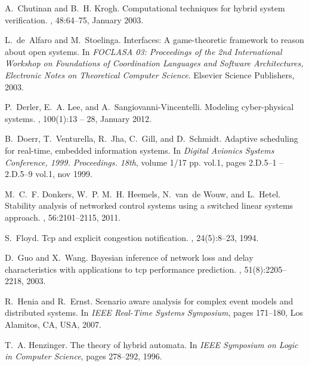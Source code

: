 \documentclass{sig-alternate-ipsn13}
\begin{document}
\begin{thebibliography}{10}
A.~Chutinan and B.~H. Krogh.
\newblock Computational techniques for hybrid system verification.
, 48:64--75, January
  2003.

L.~de~Alfaro and M.~Stoelinga.
\newblock Interfaces: A game-theoretic framework to reason about open systems.
\newblock In {\em FOCLASA 03: Proceedings of the 2nd International Workshop on
  Foundations of Coordination Languages and Software Architectures, Electronic
  Notes on Theoretical Computer Science}. Elsevier Science Publishers, 2003.

P.~Derler, E.~A. Lee, and A.~Sangiovanni-Vincentelli.
\newblock Modeling cyber-physical systems.
, 100(1):13 --
  28, January 2012.

B.~Doerr, T.~Venturella, R.~Jha, C.~Gill, and D.~Schmidt.
\newblock Adaptive scheduling for real-time, embedded information systems.
\newblock In {\em Digital Avionics Systems Conference, 1999. Proceedings.
  18th}, volume 1/17 pp. vol.1, pages 2.D.5--1 --2.D.5--9 vol.1, nov 1999.

M.~C.~F. Donkers, W.~P. M.~H. Heemels, N.~van~de Wouw, and L.~Hetel.
\newblock Stability analysis of networked control systems using a switched
  linear systems approach.
, 56:2101--2115, 2011.

S.~Floyd.
\newblock Tcp and explicit congestion notification.
, 24(5):8--23, 1994.

D.~Guo and X.~Wang.
\newblock Bayesian inference of network loss and delay characteristics with
  applications to tcp performance prediction.
, 51(8):2205--2218,
  2003.

R.~Henia and R.~Ernst.
\newblock Scenario aware analysis for complex event models and distributed
  systems.
\newblock In {\em IEEE Real-Time Systems Symposium}, pages 171--180, Los
  Alamitos, CA, USA, 2007.

T.~A. Henzinger.
\newblock The theory of hybrid automata.
\newblock In {\em IEEE Symposium on Logic in Computer Science}, pages 278--292,
  1996.


\end{thebibliography}
\end{document}
